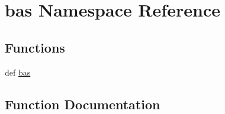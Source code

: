 \hypertarget{namespacebas}{\section{bas \-Namespace \-Reference}
\label{namespacebas}
}
\subsection*{\-Functions}
\begin{DoxyCompactItemize}
\item 
def \hyperlink{namespacebas_ad3173ea2bf51af20bd9731de975b72fc}{bas}
\end{DoxyCompactItemize}


\subsection{\-Function \-Documentation}
